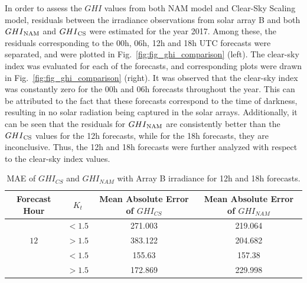 \par In order to assess the $GHI$ values from both NAM model and Clear-Sky Scaling model, residuals between the irradiance observations from solar array B and both $GHI\textsubscript{NAM}$ and $GHI\textsubscript{CS}$ were estimated for the year 2017. Among these, the residuals corresponding to the 00h, 06h, 12h and 18h UTC forecasts were separated, and were plotted in Fig.~\ref{fig:fig_ghi_comparison} (left). The clear-sky index was evaluated for each of the forecasts, and corresponding plots were drawn in Fig.~\ref{fig:fig_ghi_comparison} (right). It was observed that the clear-sky index was constantly zero for the 00h and 06h forecasts throughout the year. This can be attributed to the fact that these forecasts correspond to the time of darkness, resulting in no solar radiation being captured in the solar arrays. Additionally, it can be seen that the residuals for $GHI\textsubscript{NAM}$ are consistently better than the $GHI\textsubscript{CS}$ values for the 12h forecasts, while for the 18h forecasts, they are inconclusive. Thus, the 12h and 18h forecasts were further analyzed with respect to the clear-sky index values.

\begin{table}[h]
\begin{center}
    \caption{MAE of $GHI_{CS}$ and $GHI_{NAM}$ with Array B irradiance for 12h and 18h forecasts.}
    \label{Tab:mean_absolute_residual}
    \begin{tabular}{ c c c c }
    	\toprule
    	\textbf{\parbox{2cm}{\centering Forecast Hour}} & \boldmath\textbf{$K_t$} & \textbf{\parbox{4.5cm}{\centering Mean Absolute Error of \boldmath$GHI_{CS}$}} & \textbf{\parbox{4.5cm}{\centering Mean Absolute Error of \boldmath$GHI_{NAM}$}}\\
    	\midrule
    	\multirow{3}{4em}{$12$} & $< 1.5$ & 271.003 & 219.064 \\ &
    	$> 1.5$ & 383.122 & 204.682 \\
    	\midrule
    	\multirow{3}{4em}{$18$} & $< 1.5$ & 155.63 & 157.38 \\ &
    	$> 1.5$ & 172.869 & 229.998 \\
    	\bottomrule
    \end{tabular}
\end{center}
\end{table}

